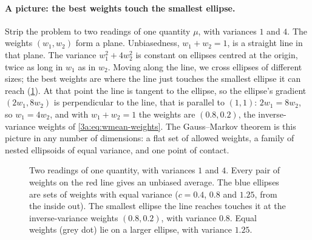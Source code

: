 \paragraph{A picture: the best weights touch the smallest ellipse.}
Strip the problem to two readings of one quantity $\mu$, with variances $1$
and $4$. The weights $(w_1,w_2)$ form a plane. Unbiasedness, $w_1+w_2=1$,
is a straight line in that plane. The variance $w_1^2+4w_2^2$ is constant
on ellipses centred at the origin, twice as long in $w_1$ as in $w_2$.
Moving along the line, we cross ellipses of different sizes; the best
weights are where the line just touches the smallest ellipse it can reach
(\cref{T5a:fig:blue-ellipse}). At that point the line is tangent to the
ellipse, so the ellipse's gradient $(2w_1,8w_2)$ is perpendicular to the line,
that is parallel to $(1,1)$: $2w_1=8w_2$, so $w_1=4w_2$, and with $w_1+w_2=1$
the weights are $(0.8,0.2)$, the inverse-variance weights of
\cref{3a:eq:wmean-weights}. The Gauss--Markov theorem is this picture in any
number of dimensions: a flat set of allowed weights, a family of nested
ellipsoids of equal variance, and one point of contact.

\begin{figure}[htbp]
\centering
{}
\caption{Two readings of one quantity, with variances $1$ and $4$. Every
pair of weights on the red line gives an unbiased average. The blue ellipses
are sets of weights with equal variance ($c=0.4$, $0.8$ and $1.25$, from the
inside out). The smallest ellipse the line reaches touches it at the
inverse-variance weights $(0.8,0.2)$, with variance $0.8$. Equal weights
(grey dot) lie on a larger ellipse, with variance $1.25$.}
\label{T5a:fig:blue-ellipse}
\end{figure}


